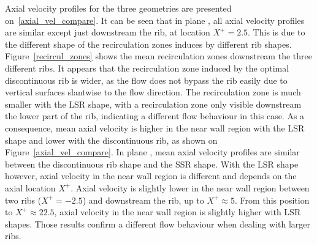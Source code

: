 Axial velocity profiles for the three geometries are presented on~\cref{axial_vel_compare}. It can be seen that in plane , all axial velocity profiles are similar except just downstream the rib, at location $X^+=2.5$. This is due to the different shape of the recirculation zones induces by different rib shapes. Figure~\ref{recircul_zones} shows the mean recirculation zones downstream the three different ribs. It appears that the recirculation zone induced by the optimal discontinuous rib is wider, as the flow does not bypass the rib easily due to vertical surfaces slantwise to the flow direction. The recirculation zone is much smaller with the LSR shape, with a recirculation zone only visible downstream the lower part of the rib, indicating a different flow behaviour in this case. As a consequence, mean axial velocity is higher in the near wall region with the LSR shape and lower with the discontinuous rib, as shown on Figure~\ref{axial_vel_compare}. In plane , mean axial velocity profiles are similar between the discontinuous rib shape and the SSR shape. With the LSR shape however, axial velocity in the near wall region is different and depends on the axial location $X^+$. Axial velocity is slightly lower in the near wall region between two ribs ($X^+=-2.5$) and downstream the rib, up to $X^+ \approx 5$. From this position to $X^+ \approx 22.5$, axial velocity in the near wall region is slightly higher with LSR shapes. Those results confirm a different flow behaviour when dealing with larger ribs.

